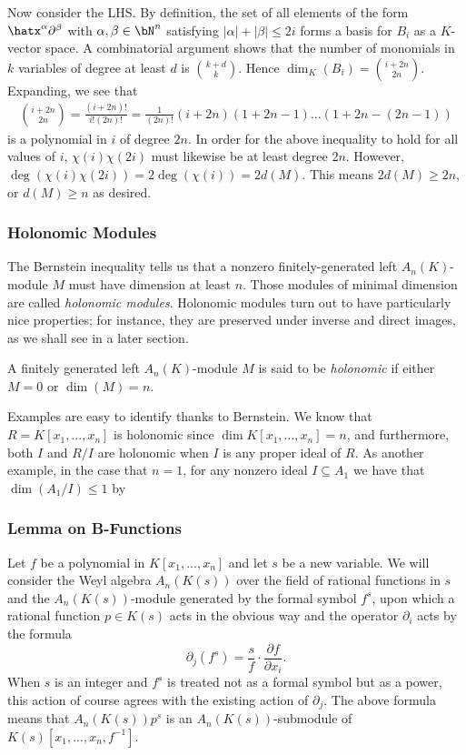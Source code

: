 \begin{prf}
	Now consider the LHS. By definition, the set of all elements of the form $\hatx^\alpha\partial^\beta$ with $\alpha, \beta \in \bN^n$ satisfying $|\alpha| + |\beta| \leq 2i$ forms a basis for $B_i$ as a $K$-vector space. A combinatorial argument shows that the number of monomials in $k$ variables of degree at least $d$ is $\binom{k+d}{k}$. Hence $\dim_K(B_i) = \binom{i+2n}{2n}$. Expanding, we see that
	\begin{align*}
		\binom{i+2n}{2n} = \frac{(i+2n)!}{i!(2n)!} = \frac{1}{(2n)!}(i+2n)(1 + 2n - 1)...(1+2n-(2n-1))
	\end{align*}
	is a polynomial in $i$ of degree $2n$. In order for the above inequality to hold for all values of $i$, $\chi(i)\chi(2i)$ must likewise be at least degree $2n$. However, $\deg(\chi(i)\chi(2i)) = 2\deg(\chi(i)) = 2d(M)$. This means $2d(M) \geq 2n$, or $d(M) \geq n$ as desired.
\end{prf}

\subsubsection{Holonomic Modules}

The Bernstein inequality tells us that a nonzero finitely-generated left $A_n(K)$-module $M$ must have dimension at least $n$. Those modules of minimal dimension are called \emph{holonomic modules}. Holonomic modules turn out to have particularly nice properties; for instance, they are preserved under inverse and direct images, as we shall see in a later section.
\begin{defn}\label{defn:holonomic-modules}
	A finitely generated left $A_n(K)$-module $M$ is said to be \emph{holonomic} if either $M = 0$ or $\dim(M) = n$.
\end{defn}
Examples are easy to identify thanks to Bernstein. We know that $R = K[x_1,...,x_n]$ is holonomic since $\dim K[x_1,...,x_n] = n$, and furthermore, both $I$ and $R/I$ are holonomic when $I$ is any proper ideal of $R$. As another example, in the case that $n = 1$, for any nonzero ideal $I \subseteq A_1$ we have that $\dim(A_1/I) \leq 1$ by 
\subsubsection{Lemma on B-Functions}
Let $f$ be a polynomial in $K[x_1,...,x_n]$ and let $s$ be a new variable. We will consider the Weyl algebra $A_n(K(s))$ over the field of rational functions in $s$ and the $A_n(K(s))$-module generated by the formal symbol $f^s$, upon which a rational function $p \in K(s)$ acts in the obvious way and the operator $\partial_i$ acts by the formula
\begin{equation}\label{eqn:formula-preceeding-b-func}
	\partial_j\left(f^s\right) = \frac{s}{f}\cdot \frac{\partial f}{\partial x_i}.
\end{equation}
When $s$ is an integer and $f^s$ is treated not as a formal symbol but as a power, this action of course agrees with the existing action of $\partial_j$. The above formula means that $A_n(K(s))p^s$ is an $A_n(K(s))$-submodule of $K(s)[x_1,...,x_n,f^{-1}]$.

